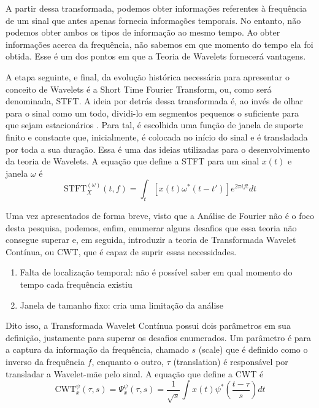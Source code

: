 \documentclass[12pt]{article}
\begin{document}
	A partir dessa transformada, podemos obter informações referentes à frequência de um sinal que antes apenas fornecia informações temporais. No entanto, não podemos obter ambos os tipos de informação ao mesmo tempo. Ao obter informações acerca da frequência, não sabemos em que momento do tempo ela foi obtida. Esse é um dos pontos em que a Teoria de \textrm{Wavelets} fornecerá vantagens.
	
	A etapa seguinte, e final, da evolução histórica necessária para apresentar o conceito de \textrm{Wavelets} é a \textrm{Short Time Fourier Transform}, ou, como será denominada, \textrm{STFT}. A ideia por detrás dessa transformada é, ao invés de olhar para o sinal como um todo, dividi-lo em segmentos pequenos o suficiente para que sejam estacionários \cite{WaveTutorial}. Para tal, é escolhida uma \textrm{função de janela} de suporte finito e constante que, inicialmente, é colocada no início do sinal e é transladada por toda a sua duração. Essa é uma das ideias utilizadas para o desenvolvimento da teoria de \textrm{Wavelets}. A equação que define a \textrm{STFT} para um sinal $x(t)$ e janela $\omega$ é
	\begin{equation*}
		\textrm{STFT}^{(\omega)}_X(t,f)=\int_{t}[x(t)\omega^{*}(t-t')]e^{2\pi if t}dt
	\end{equation*}

	Uma vez apresentados de forma breve, visto que a Análise de Fourier não é o foco desta pesquisa, podemos, enfim, enumerar alguns desafios que essa teoria não consegue superar e, em seguida, introduzir a teoria de Transformada \textrm{Wavelet} Contínua, ou \textrm{CWT}, que é capaz de suprir essas necessidades.
	
	\begin{enumerate}
		\item Falta de localização temporal: não é possível saber em qual momento do tempo cada frequência existiu
		\item Janela de tamanho fixo: cria uma limitação da análise 
	\end{enumerate}

	Dito isso, a Transformada \textrm{Wavelet} Contínua possui dois parâmetros em sua definição, justamente para superar os desafios enumerados. Um parâmetro é para a captura da informação da frequência, chamado $s$ \textrm{(scale)} que é definido como o inverso da frequência $f$, enquanto o outro, $\tau$ \textrm{(translation)} é responsável por transladar a \textrm{Wavelet}-mãe pelo sinal. A equação que define a \textrm{CWT} é
	\begin{equation}\label{eq:CWT}
		\textrm{CWT}^{\psi}_{x}(\tau,s)=\Psi^{\psi}_x(\tau,s)=\dfrac{1}{\sqrt{s}}\int x(t)\psi^{*}(\dfrac{t-\tau}{s})dt
	\end{equation}
\end{document}
